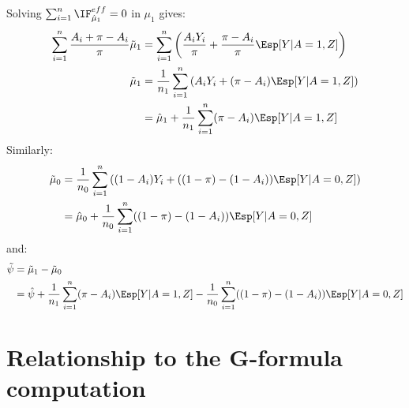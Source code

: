 \documentclass[12pt]{article}
\begin{document}
Solving \(\sum_{i=1}^n \IF^{eff}_{\hat{\mu}_1} = 0\) in \(\mu_1\) gives:
\begin{align*}
\sum_{i=1}^n\frac{A_i + \pi - A_i }{\pi}\tilde{\mu}_1 &= \sum_{i=1}^n \left( \frac{A_i Y_i}{\pi} + \frac{\pi-A_i}{\pi} \Esp[Y|A=1,Z] \right)\\
\tilde{\mu}_1 &= \frac{1}{n_1}\sum_{i=1}^n \left( A_i Y_i + (\pi-A_i) \Esp[Y|A=1,Z] \right) \\
              &= \hat{\mu}_1 + \frac{1}{n_1}\sum_{i=1}^n (\pi-A_i) \Esp[Y|A=1,Z]
\end{align*}
Similarly:
\begin{align*}
\tilde{\mu}_0 &= \frac{1}{n_0}\sum_{i=1}^n \left( (1-A_i) Y_i + ((1-\pi)-(1-A_i)) \Esp[Y|A=0,Z] \right) \\
              &= \hat{\mu}_0 + \frac{1}{n_0}\sum_{i=1}^n ((1-\pi)-(1-A_i)) \Esp[Y|A=0,Z]
\end{align*}
and:
\begin{align*}
\tilde{\psi} &= \tilde{\mu}_1 - \tilde{\mu}_0 \\
              &= \hat{\psi} + \frac{1}{n_1}\sum_{i=1}^n (\pi-A_i) \Esp[Y|A=1,Z] - \frac{1}{n_0}\sum_{i=1}^n ((1-\pi)-(1-A_i)) \Esp[Y|A=0,Z]
\end{align*}

\section{Relationship to the G-formula computation}
\label{sec:orga2231ff}
\end{document}
